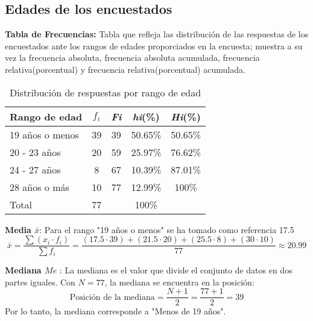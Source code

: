 \subsection{Edades de los encuestados}
	\textbf{Tabla de Frecuencias:} 
	Tabla que refleja las distribución de las respuestas de los encuestados ante los rangos de edades proporciados en la encuesta; muestra a su vez la frecuencia absoluta, frecuencia absoluta acumulada, frecuencia relativa(porcentual) y frecuencia relativa(porcentual) acumulada.
	
	\begin{table}[h!]
		\centering
		\renewcommand{\arraystretch}{1.2} %
		\begin{tabular}{l c c c c}
			\hline
			{Rango de edad} & {\(f_i\)} & \textit{Fi} & \textit{hi}(\%) & \textit{Hi}(\%)\\
			\hline
			19 años o menos   & 39 & 39 & 50.65\% & 50.65\%\\
			20 - 23 años       & 20 & 59 & 25.97\% & 76.62\%\\
			24 - 27 años       & 8  & 67 & 10.39\% & 87.01\%\\
			28 años o más      & 10 & 77 & 12.99\% & 100\%\\
			\hline
			Total			   & 77 & & 100\% \\
			\hline
		\end{tabular}
		\caption{Distribución de respuestas por rango de edad}
		\label{tabla:edad}
	\end{table}
	 \textbf{Media $\bar{x}$}: Para el rango "19 años o menos" se ha tomado como referencia 17.5
	\begin{equation*}
		\bar{x} = \dfrac{\sum (x_i \cdot f_i)}{\sum f_i} = \dfrac{(17.5 \cdot 39) + (21.5 \cdot 20) + (25.5 \cdot 8) + (30 \cdot 10)}{77} \approx 20.99
	\end{equation*}
	
	 \textbf{Mediana $Me$ }: La mediana es el valor que divide el conjunto de datos en dos partes iguales. Con \(N = 77\), la mediana se encuentra en la posición:
	\begin{equation*}
		\text{Posición de la mediana} = \dfrac{N + 1}{2} = \dfrac{77 + 1}{2} = 39
	\end{equation*}
	Por lo tanto, la mediana corresponde a "Menos de 19 años".
	

